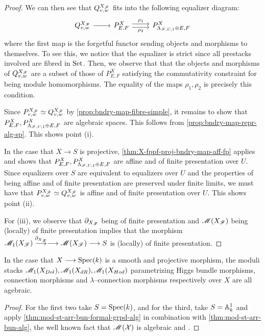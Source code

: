 \documentclass[11pt]{amsart}
\begin{document}
\begin{proof}
We can then see that $Q^{X_\mathscr{F}}_{v, w}$ fits into the following
equalizer diagram:
\[\begin{tikzcd}
Q^{X_\sF}_{v, w} \ar[r] &
P^X_{E, F}
  \ar[r, shift left, "\rho_1" above]
  \ar[r, shift right, "\rho_2" below] &
P^{X}_{\Lambda_{\sF, U, 1} \oplus E, F}
\end{tikzcd}\]
where the first map is the forgetful functor sending objects and morphisms
to themselves. To see this, we notice that the equalizer is strict since
all prestacks involved are fibred in $\mathrm{Set}$. Then, we observe that
that the objects and morphisms of $Q^{X_\mathscr{F}}_{v, w}$ are a subset of those
of $P^X_{E, F}$ satisfying the commutativity constraint for being module
homomorphisms. The equality of the maps $\rho_1, \rho_2$ is precisely
this condition.

Since $P^{X_\mathscr{F}}_{v, w} \simeq Q^{X_\mathscr{F}}_{v, w}$ by
\cref{prop:bndry-map-fibre-simple}, it remains to show that
$P^X_{E, F}, P^X_{\Lambda_{\mathscr{F}, U, 1} \oplus E, F}$ are algebraic spaces.
This follows from \cref{prop:bndry-map-repr-alg-sp}. This shows point (i).

In the case that
$X \to S$ is projective, \cref{thm:X-fppf-proj-bndry-map-aff-fp} applies
and shows that $P^X_{E, F}, P^X_{\Lambda_{\mathscr{F}, U, 1} \oplus E, F}$ are
affine and of finite presentation over $U$. Since equalizers over $S$
are equivalent to equalizers over $U$ and the properties of being affine and of
finite presentation are preserved under finite limits, we must have that
$P^{X_\mathscr{F}}_{v, w} \simeq Q^{X_\mathscr{F}}_{v, w}$ is affine and of finite presentation
over $U$. This shows point (ii).

For (iii), we observe that $\partial_{X_\mathscr{F}}$ being of finite
presentation and $\mathscr{M}(X_\mathscr{F})$ being (locally) of finite presentation implies
that the morphism $\sM_1(X_\sF) \to[\partial_{X_\sF}] \to \sM(X_\sF) \to S$
is (locally) of finite presentation.
\end{proof}

\begin{thm}\label{thm:mod-st-conn-alg}
In the case that $X \to \Spec(k)$ is a smooth and projective morphism,
the moduli stacks
$\mathscr{M}_1(X_{Dol}), \mathscr{M}_1(X_{dR}), \mathscr{M}_1(X_{Hod})$ parametrizing
Higgs bundle morphisms, connection morphisms and $\lambda$--connection
morphisms respectively over $X$ are all agebraic.
\end{thm}
\begin{proof}
For the first two take $S = \mathrm{Spec}(k)$, and for the third, take
$S = \mathbb{A}^1_k$ and apply \cref{thm:mod-st-arr-bun-formal-grpd-alg} in combination
with \cref{thm:mod-st-arr-bun-alg}, the well known fact that
$\mathscr{M}(\mathcal{X})$ is algebraic and \cite[Theorem 6.13]{GeomNonAbHodgeFilt}.
\end{proof}
\end{document}

